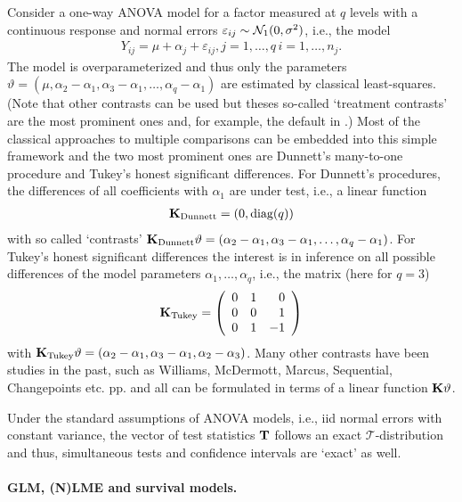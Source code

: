 \documentclass[12pt]{article}
\begin{document}
Consider a one-way ANOVA model for a factor measured at $q$ levels
with a continuous response and normal errors $\varepsilon_{ij} \sim \mathcal{N}_1(0, \sigma^2)$, 
i.e., the model
\begin{eqnarray*}
Y_{ij} = \mu + \alpha_{j} + \varepsilon_{ij}, j = 1,\dots,q \, i = 1, \dots, n_j.
\end{eqnarray*}
The model is overparameterized and thus only the parameters
$\vartheta = (\mu, \alpha_2 - \alpha_1, \alpha_3 - \alpha_1, \dots, \alpha_q - \alpha_1)$ 
are  estimated by classical least-squares. (Note that other contrasts can be used
but theses so-called `treatment contrasts' are the most prominent ones and,
for example, the default in \RR.) 
Most of the classical approaches
to multiple comparisons can be embedded into this simple framework and 
the two most prominent ones are Dunnett's many-to-one procedure and
Tukey's honest significant differences. For Dunnett's procedures,
the differences of all coefficients with $\alpha_1$ are under test, i.e.,
a linear function
\begin{eqnarray*}
\mathbf{K}_\text{Dunnett} = (0, \text{diag}(q))
\end{eqnarray*}
with so called `contrasts' 
$\mathbf{K}_\text{Dunnett} \vartheta = (\alpha_2 - \alpha_1, \alpha_3 - \alpha_1, \dots, \alpha_q - \alpha_1)$.
For Tukey's honest significant differences the interest is in inference on
all possible differences of the model parameters $\alpha_1, \dots, \alpha_q$, i.e., 
the matrix (here for $q = 3$)
\begin{eqnarray*}
\mathbf{K}_\text{Tukey} = \left( 
\begin{array}{rrr} 0 & 1 & 0 \\
0 & 0 & 1 \\
0 & 1 & -1 
\end{array} \right)
\end{eqnarray*}
with $\mathbf{K}_\text{Tukey} \vartheta = (\alpha_2 - \alpha_1, \alpha_3 - \alpha_1, \alpha_2 - \alpha_3)$.
Many other contrasts have been studies in the past, such as Williams, McDermott, Marcus,
Sequential, Changepoints etc. pp.  and all can be formulated in terms
of a linear function $\mathbf{K} \vartheta$.

Under the standard assumptions of ANOVA models, i.e., iid normal errors with constant
variance, the vector of test statistics $\mathbf{T}$ follows an exact $\mathcal{T}$-distribution and
thus, simultaneous tests and confidence intervals are `exact' as well.

\paragraph{GLM, (N)LME and survival models.}
\end{document}
